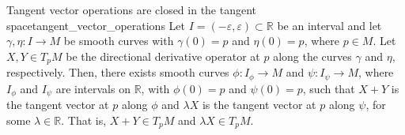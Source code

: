 \begin{proposition}{Tangent vector operations are closed in the tangent space}{tangent_vector_operations}
    Let \(I = (-\varepsilon, \varepsilon) \subset \mathbb{R}\) be an interval and let \(\gamma, \eta : I \to M\) be smooth curves with \(\gamma(0) = p\) and \(\eta(0) = p\), where \(p \in M\). Let \(X, Y \in T_pM\) be the directional derivative operator at \(p\) along the curves \(\gamma\) and \(\eta\), respectively. Then, there exists smooth curves \(\phi : I_\phi \to M\) and \(\psi : I_\psi \to M\), where \(I_\phi\) and \(I_\psi\) are intervals on \(\mathbb{R}\), with \(\phi(0) = p\) and \(\psi(0) = p\), such that \(X+Y\) is the tangent vector at \(p\) along \(\phi\) and \(\lambda X\) is the tangent vector at \(p\) along \(\psi\), for some \(\lambda \in \mathbb{R}\). That is, \(X + Y \in T_pM\) and \(\lambda X \in T_pM\).
\end{proposition}
